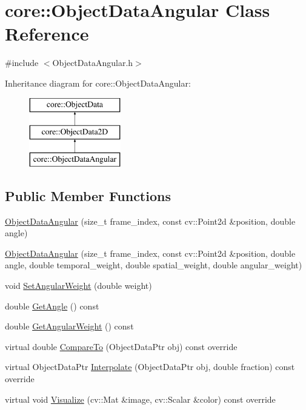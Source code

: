 \hypertarget{classcore_1_1ObjectDataAngular}{}\section{core\+:\+:Object\+Data\+Angular Class Reference}
\label{classcore_1_1ObjectDataAngular}


{\ttfamily \#include $<$Object\+Data\+Angular.\+h$>$}

Inheritance diagram for core\+:\+:Object\+Data\+Angular\+:\begin{figure}[H]
\begin{center}
\leavevmode
\includegraphics[height=3.000000cm]{classcore_1_1ObjectDataAngular}
\end{center}
\end{figure}
\subsection*{Public Member Functions}
\begin{DoxyCompactItemize}
\item 
\hyperlink{classcore_1_1ObjectDataAngular_a276b02fc7646e3275f1cb81fca7e9a47}{Object\+Data\+Angular} (size\+\_\+t frame\+\_\+index, const cv\+::\+Point2d \&position, double angle)
\item 
\hyperlink{classcore_1_1ObjectDataAngular_aae3a8f335e26771d06c8940931d5d654}{Object\+Data\+Angular} (size\+\_\+t frame\+\_\+index, const cv\+::\+Point2d \&position, double angle, double temporal\+\_\+weight, double spatial\+\_\+weight, double angular\+\_\+weight)
\item 
void \hyperlink{classcore_1_1ObjectDataAngular_af6772caef2337f3c12a3f52049c4d853}{Set\+Angular\+Weight} (double weight)
\item 
double \hyperlink{classcore_1_1ObjectDataAngular_aad72f2e6cbd690f492d71b3dbe20c6b8}{Get\+Angle} () const 
\item 
double \hyperlink{classcore_1_1ObjectDataAngular_a35e13c65fd7ba246ce0ee1680f2690cf}{Get\+Angular\+Weight} () const 
\item 
virtual double \hyperlink{classcore_1_1ObjectDataAngular_a2932240c6c082b76f2c04723cdf3e4f9}{Compare\+To} (Object\+Data\+Ptr obj) const override
\item 
virtual Object\+Data\+Ptr \hyperlink{classcore_1_1ObjectDataAngular_a42962dd1f994b2577133450e755d586e}{Interpolate} (Object\+Data\+Ptr obj, double fraction) const override
\item 
virtual void \hyperlink{classcore_1_1ObjectDataAngular_acb4265f6de511238460df118148bc85c}{Visualize} (cv\+::\+Mat \&image, cv\+::\+Scalar \&color) const override
\end{DoxyCompactItemize}


